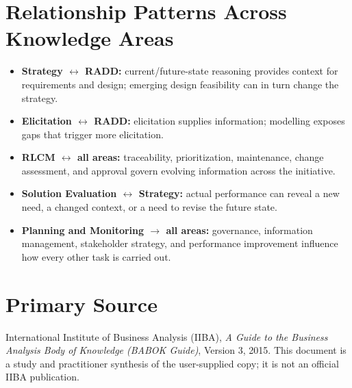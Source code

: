 \documentclass[11pt]{article}
\begin{document}
\section{Relationship Patterns Across Knowledge Areas}
\begin{itemize}
\item \textbf{Strategy $\leftrightarrow$ RADD:} current/future-state reasoning provides context for requirements and design; emerging design feasibility can in turn change the strategy.
\item \textbf{Elicitation $\leftrightarrow$ RADD:} elicitation supplies information; modelling exposes gaps that trigger more elicitation.
\item \textbf{RLCM $\leftrightarrow$ all areas:} traceability, prioritization, maintenance, change assessment, and approval govern evolving information across the initiative.
\item \textbf{Solution Evaluation $\leftrightarrow$ Strategy:} actual performance can reveal a new need, a changed context, or a need to revise the future state.
\item \textbf{Planning and Monitoring $\rightarrow$ all areas:} governance, information management, stakeholder strategy, and performance improvement influence how every other task is carried out.
\end{itemize}

\section*{Primary Source}
International Institute of Business Analysis (IIBA), \emph{A Guide to the Business Analysis Body of Knowledge (BABOK Guide)}, Version 3, 2015. This document is a study and practitioner synthesis of the user-supplied copy; it is not an official IIBA publication.
\end{document}
